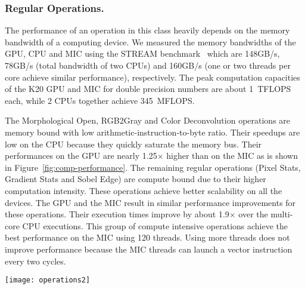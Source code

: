 \subsubsection{{\bf Regular Operations.}}  
The performance of an operation in this class heavily depends on the memory 
bandwidth of a computing device. We measured the memory bandwidths of the 
GPU, CPU and MIC using the STREAM benchmark~\cite{McCalpin1995} which are 
148GB/s, 78GB/s (total bandwidth of two CPUs) and 160GB/s 
(one or two threads per core achieve similar performance), respectively. 
The peak computation capacities of the K20 GPU and MIC for double 
precision numbers are about 1~TFLOPS each, while 2 CPUs together 
achieve 345~MFLOPS.

The Morphological Open, RGB2Gray and Color Deconvolution operations are memory
bound with low arithmetic-instruction-to-byte ratio. Their speedups are low on
the CPU because they quickly saturate the memory bus. Their performances on the 
GPU are nearly 1.25$\times$ higher than on the MIC as is shown in 
Figure~\ref{fig:comp-performance}. The remaining 
regular operations (Pixel Stats, Gradient Stats and Sobel Edge) are compute
bound due to their higher computation intensity. These operations achieve
better scalability on all the devices. The GPU and the MIC result in similar 
performance improvements for these operations. Their execution times improve by 
about 1.9$\times$ over the multi-core CPU 
executions. This group of compute intensive operations 
achieve the best performance on the MIC using 120 threads. Using more threads 
does not improve performance because the MIC threads can launch a vector instruction 
every two cycles. 
\begin{figure*}[htb!]
\begin{center}
\texttt{[image: operations2]}
\vspace*{-4ex}
\caption{Speedups of the core operations on multi-core CPU, MIC and GPU, 
using the single-core CPU versions as baseline. The number above each dash 
is the number of threads that led to the best performance on the MIC. The
number above the graph in each column is the percent contribution of the 
corresponding operation to the overall application execution time.}
\vspace*{-4ex}
\label{fig:comp-performance}
\end{center}
\end{figure*}
